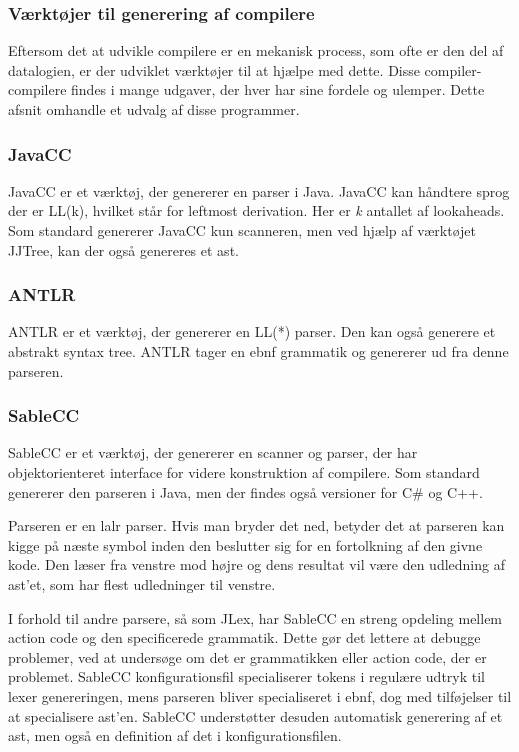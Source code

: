 \subsubsection{Værktøjer til generering af compilere}
\label{ssec:toolsforcc}

Eftersom det at udvikle compilere er en mekanisk process, som ofte er den del af datalogien, er der udviklet værktøjer til at hjælpe med dette. Disse compiler-compilere findes i mange udgaver, der hver har sine fordele og ulemper. Dette afsnit omhandle et udvalg af disse programmer.

\subsubsection{JavaCC}
JavaCC er et værktøj, der genererer en parser i Java. JavaCC kan håndtere sprog der er LL(k), hvilket står for leftmost derivation. Her er \textit{k} antallet af lookaheads. Som standard genererer JavaCC kun scanneren, men ved hjælp af værktøjet JJTree, kan der også genereres et \gls{ast}.

\subsubsection{ANTLR}
ANTLR er et værktøj, der genererer en LL(*) parser. Den kan også generere et abstrakt syntax tree. ANTLR tager en \gls{ebnf} grammatik og genererer ud fra denne parseren.

\subsubsection{SableCC}
SableCC er et værktøj, der genererer en scanner og parser, der har objektorienteret interface for videre konstruktion af compilere. Som standard genererer den parseren i Java, men der findes også versioner for C\# og C++.
    
    
\noindent Parseren er en \gls{lalr} parser. Hvis man bryder det ned, betyder det at parseren kan kigge på næste symbol inden den beslutter sig for en fortolkning af den givne kode. Den læser fra venstre mod højre og dens resultat vil være den udledning af \gls{ast}'et, som har flest udledninger til venstre.

I forhold til andre parsere, så som JLex, har SableCC en streng opdeling mellem action code og den specificerede grammatik. Dette gør det lettere at debugge problemer, ved at undersøge om det er grammatikken eller action code, der er problemet. SableCC konfigurationsfil specialiserer tokens i regulære udtryk til lexer genereringen, mens parseren bliver specialiseret i \gls{ebnf}, dog med tilføjelser til at specialisere \gls{ast}'en. SableCC understøtter desuden automatisk generering af et \gls{ast}, men også en definition af det i konfigurationsfilen.
